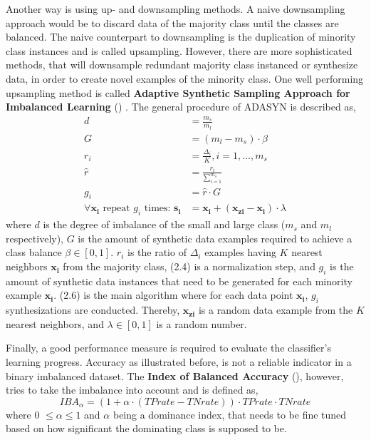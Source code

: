   Another way is using up- and downsampling methods.
  A naive downsampling approach would be to discard data of the majority class until the classes are balanced. The naive counterpart to downsampling is the duplication of minority class instances and is called upsampling. However, there are more sophisticated methods, that will downsample redundant majority class instanced or synthesize data, in order to create novel examples of the minority class.
  One well performing upsampling method is called \textbf{Adaptive Synthetic Sampling Approach for Imbalanced Learning} () \citep{He2008}.
  The general procedure of ADASYN is described as,
  \begin{align}
    d &= \frac{m_s}{m_l} \\
    G &= (m_l - m_s) \cdot \beta \\
    r_i &= \frac{\Delta_i}{K}, i=1, \dots, m_s \\
    \hat{r} &= \frac{r_i}{\sum_{i=1}^{m_s}} \\
    g_i &= \hat{r} \cdot G \\
    \forall \boldsymbol{x_i} \text{ repeat } g_i \text{ times: } \boldsymbol{s_i} &= \boldsymbol{x_i} + (\boldsymbol{x_{zi}} - \boldsymbol{x_i}) \cdot \lambda
  \end{align}
  where $d$ is the degree of imbalance of the small and large class ($m_s$ and $m_l$ respectively), $G$ is the amount of synthetic data examples required to achieve a class balance $\beta \in [0,1]$.
  $r_i$ is the ratio of $\Delta_i$ examples having $K$ nearest neighbors $\boldsymbol{x_i}$ from the majority class, (2.4) is a normalization step, and $g_i$ is the amount of synthetic data instances that need to be generated for each minority example $\boldsymbol{x_i}$.
  (2.6) is the main algorithm where for each data point $\boldsymbol{x_i}$, $g_i$ synthesizations are conducted.
  Thereby, $\boldsymbol{x_{zi}}$ is a random data example from the $K$ nearest neighbors, and $\lambda \in [0,1]$ is a random number.

  Finally, a good performance measure is required to evaluate the classifier's learning progress.
  Accuracy as illustrated before, is not a reliable indicator in a binary imbalanced dataset.
  The \textbf{Index of Balanced Accuracy} (), however, tries to take the imbalance into account and is defined as, \[IBA_{\alpha} = (1 + \alpha \cdot (TPrate - TNrate)) \cdot TPrate \cdot TNrate \] where  0 $\leq \alpha \leq 1$ and $\alpha$ being a dominance index, that needs to be fine tuned based on how significant the dominating class is supposed to be.

